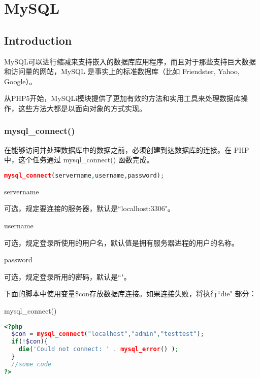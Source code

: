 \part{MySQL}



\chapter{Introduction}








MySQL可以进行缩减来支持嵌入的数据库应用程序，而且对于那些支持巨大数据和访问量的网站，MySQL 是事实上的标准数据库（比如 Friendster, Yahoo, Google）。

从PHP5开始，MySQLi模块提供了更加有效的方法和实用工具来处理数据库操作，这些方法大都是以面向对象的方式实现。

\section{mysql\_connect()}


在能够访问并处理数据库中的数据之前，必须创建到达数据库的连接。在 PHP 中，这个任务通过 mysql\_connect() 函数完成。


\begin{lstlisting}[language=PHP]
mysql_connect(servername,username,password);
\end{lstlisting}

\begin{compactitem}
\item servername

可选，规定要连接的服务器，默认是``localhost:3306"。
\item username

可选，规定登录所使用的用户名，默认值是拥有服务器进程的用户的名称。
\item password

可选，规定登录所用的密码，默认是``"。
\end{compactitem}

下面的脚本中使用变量\$con存放数据库连接。如果连接失败，将执行``die" 部分：

\begin{example}
mysql\_connect()
\begin{lstlisting}[language=PHP]
<?php
  $con = mysql_connect("localhost","admin","testtest");
  if(!$con){
    die('Could not connect: ' . mysql_error() );
  }
  //some code
?>
\end{lstlisting}
\end{example}

